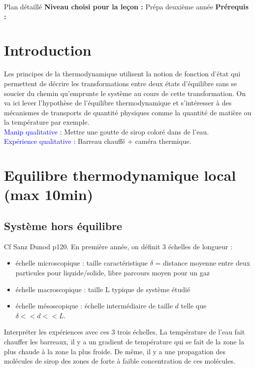 \begin{reportBlock}{Plan détaillé}
  \textbf{Niveau choisi pour la leçon :} Prépa deuxième année
  \newline
  \textbf{Prérequis : }
  \newline

\section*{Introduction}
Les principes de la thermodynamique utilisent la notion de fonction d'état qui permettent de décrire les transformations entre deux états d'équilibre sans se soucier du chemin qu'emprunte le système au cours de cette transformation. On va ici lever l'hypothèse de l'équilibre thermodynamique et s'intéresser à des mécanismes de transports de quantité physiques comme la quantité de matière ou la température par exemple.\\

\textcolor{blue}{Manip qualitative :} Mettre une goutte de sirop coloré dans de l'eau.\\

\textcolor{blue}{Expérience qualitative :} Barreau  chauffé + caméra thermique.\\



\section{Equilibre thermodynamique local (max 10min)}

\subsection{Système hors équilibre}
Cf Sanz Dunod p120. En première année, on définit 3 échelles de longueur :
\begin{itemize}
    \item échelle microscopique : taille caractéristique $\delta$ = distance moyenne entre deux particules pour liquide/solide, libre parcours moyen pour un gaz
    \item échelle macroscopique : taille L typique de système étudié
    \item échelle mésoscopique : échelle intermédiaire de taille $d$ telle que $\delta<<d<<L$.
\end{itemize}
Interpréter les expériences avec ces 3 trois échelles. La température de l'eau fait chauffer les barreaux, il y a un gradient de température qui se fait de la zone la plus chaude à la zone la plus froide. De même, il y a une propagation des molécules de sirop des zones de forte à faible concentration de ces molécules. \\


\end{reportBlock}

